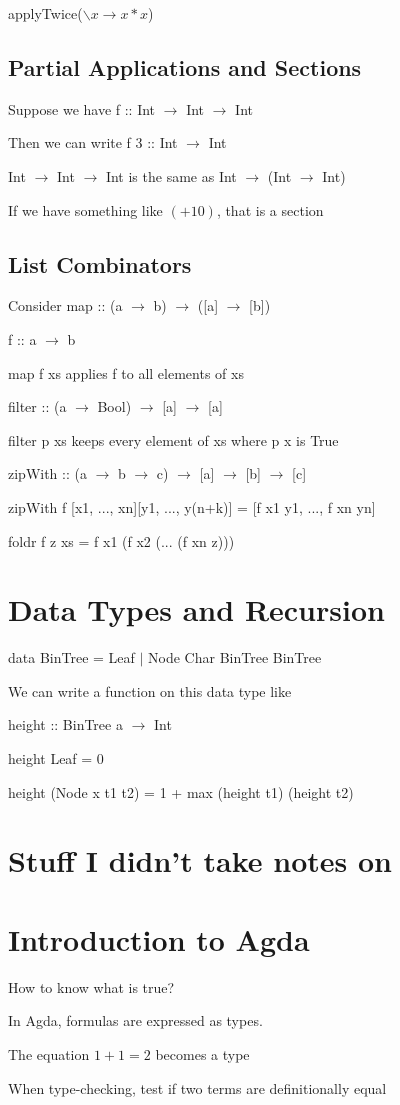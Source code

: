 \documentclass[12pt]{article}
\begin{document}
applyTwice($\backslash x \to x * x$)

\subsection{Partial Applications and Sections}

Suppose we have f :: Int $\to$ Int $\to$ Int

Then we can write f 3 :: Int $\to$ Int

Int $\to$ Int $\to$ Int is the same as Int $\to$ (Int $\to$ Int)

If we have something like $(+ 10)$, that is a section

\subsection{List Combinators}

Consider map :: (a $\to$ b) $\to$ ([a] $\to$ [b])

f :: a $\to$ b

map f xs applies f to all elements of xs

filter :: (a $\to$ Bool) $\to$ [a] $\to$ [a]

filter p xs keeps every element of xs where p x is True

zipWith :: (a $\to$ b $\to$ c) $\to$ [a] $\to$ [b] $\to$ [c]

zipWith f [x1, ..., xn][y1, ..., y(n+k)] = [f x1 y1, ..., f xn yn]

foldr f z xs = f x1 (f x2 (... (f xn z)))

\section{Data Types and Recursion}

data BinTree = Leaf $|$ Node Char BinTree BinTree

We can write a function on this data type like

height :: BinTree a $\to$ Int

height Leaf = 0

height (Node x t1 t2) = 1 + max (height t1) (height t2)

\section{Stuff I didn't take notes on}

\section{Introduction to Agda}

How to know what is true?

In Agda, formulas are expressed as types.

The equation $1 + 1 = 2$ becomes a type

When type-checking, test if two terms are definitionally equal
\end{document}
